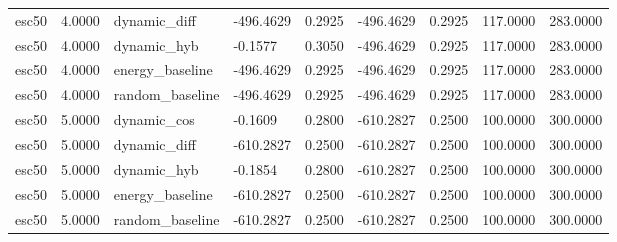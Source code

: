 \begin{table}[htbp]
\begin{tabular}{lllllllll}
esc50 & 4.0000 & dynamic\_diff & -496.4629 & 0.2925 & -496.4629 & 0.2925 & 117.0000 & 283.0000 \\
esc50 & 4.0000 & dynamic\_hyb & -0.1577 & 0.3050 & -496.4629 & 0.2925 & 117.0000 & 283.0000 \\
esc50 & 4.0000 & energy\_baseline & -496.4629 & 0.2925 & -496.4629 & 0.2925 & 117.0000 & 283.0000 \\
esc50 & 4.0000 & random\_baseline & -496.4629 & 0.2925 & -496.4629 & 0.2925 & 117.0000 & 283.0000 \\
esc50 & 5.0000 & dynamic\_cos & -0.1609 & 0.2800 & -610.2827 & 0.2500 & 100.0000 & 300.0000 \\
esc50 & 5.0000 & dynamic\_diff & -610.2827 & 0.2500 & -610.2827 & 0.2500 & 100.0000 & 300.0000 \\
esc50 & 5.0000 & dynamic\_hyb & -0.1854 & 0.2800 & -610.2827 & 0.2500 & 100.0000 & 300.0000 \\
esc50 & 5.0000 & energy\_baseline & -610.2827 & 0.2500 & -610.2827 & 0.2500 & 100.0000 & 300.0000 \\
esc50 & 5.0000 & random\_baseline & -610.2827 & 0.2500 & -610.2827 & 0.2500 & 100.0000 & 300.0000 \\
\bottomrule
\end{tabular}
\end{table}
